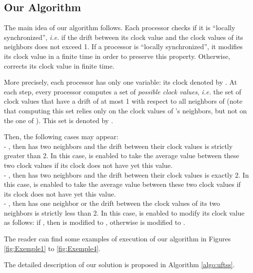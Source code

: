 \documentclass[11pt,english,letterpaper]{article}
\begin{document}
\subsection{Our Algorithm}

The main idea of our algorithm follows. Each processor checks if it is ``locally synchronized'', \emph{i.e.} if the drift between its clock value and the clock values of its neighbors does not exceed 1. If a processor  is ``locally synchronized'', it modifies its clock value in a finite time in order to preserve this property. Otherwise,  corrects its clock value in finite time. 

More precisely, each processor  has only one variable: its clock denoted by . At each step, every processor  computes a set of \emph{possible clock values},	\emph{i.e.} the set of clock values that have a drift of at most 1 with respect to all neighbors of  (note that computing this set relies only on the clock values of 's neighbors, but not on the one of ). This set is denoted by .

Then, the following cases may appear:\\
\indent - , then  has two neighbors and the drift between their clock values is strictly greater than 2. In this case,  is enabled to take the average value between these two clock values if its clock does not have yet this value.\\
\indent - , then  has two neighbors and the drift between their clock values is exactly 2. In this case,  is enabled	to take the average value between these two clock values if its clock does not have yet this value.\\
\indent - , then  has one neighbor or the drift between the clock values of its two neighbors is strictly less than 2. In this case,  is enabled to modify its clock value as follows: if , then  is modified to , otherwise  is modified to .

The reader can find some examples of execution of our algorithm in Figures \ref{fig:Exemple1} to \ref{fig:Exemple4}.

The detailed description of our solution is proposed in Algorithm \ref{algo:uftss}.
\end{document}
